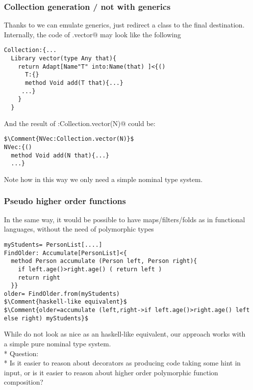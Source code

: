 \begin{frame}[fragile]
\frametitle{Collection generation / not with generics}
Thanks to \Q@Adapt@ we can emulate generics, just redirect a class to the final destination.
Internally, the code of \Q@Collection.vector@ may look like the following
\begin{NiceCode}{59ex}{0.8}
\begin{lstlisting}
Collection:{...
  Library vector(type Any that){
    return Adapt[Name"T" into:Name(that) ]<{()
      T:{}
      method Void add(T that){...}
     ...}
    }
  }
\end{lstlisting}
\end{NiceCode}
And the result of \Q@NVec:Collection.vector(N)@ could be:
\begin{NiceCode}{59ex}{0.8}
\begin{lstlisting}
$\Comment{NVec:Collection.vector(N)}$
NVec:{()
  method Void add(N that){...}
  ...}
\end{lstlisting}
\end{NiceCode}


Note how in this way we only need a simple nominal type system.
\end{frame}


\begin{frame}[fragile]
\frametitle{Pseudo higher order functions}
In the same way, it would be possible to have maps/filters/folds as in functional languages, without the need of polymorphic types
\begin{NiceCode}{59ex}{0.8}
\begin{lstlisting}
myStudents= PersonList[....]
FindOlder: Accumulate[PersonList]<{
  method Person accumulate (Person left, Person right){
    if left.age()>right.age() ( return left )
    return right
  }}
older= FindOlder.from(myStudents)
$\Comment{haskell-like equivalent}$
$\Comment{older=accumulate (left,right->if left.age()>right.age() left else right) myStudents}$
\end{lstlisting}
\end{NiceCode}
While do not look as nice as an haskell-like equivalent,
our approach works with a simple pure nominal type system.
\\*
\pause
\alert{Question:}
\\*
Is it easier to reason about decorators as producing code taking some hint in input, or
is it easier to reason about higher order polymorphic function composition?
\end{frame}


